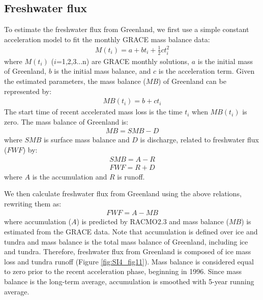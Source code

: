 \subsection{Freshwater flux}
To estimate the freshwater flux from Greenland, we first use a simple constant acceleration model to fit the monthly GRACE mass balance data:  
\begin{equation}
\begin{aligned}
M(t_{i})=a+bt_{i}+\frac{1}{2}ct_{i}^{2}
\end{aligned} 
\end{equation}
where $M(t_{i})$ ($i$=1,2,3...n) are GRACE monthly solutions, $a$ is the initial mass of Greenland, $b$ is the initial mass balance, and $c$ is the acceleration term.  Given the estimated parameters, the mass balance ($MB$) of Greenland can be represented by:
\begin{equation}
\begin{aligned}
MB(t_{i})=b+ct_{i}
\end{aligned} 
\end{equation}
The start time of recent accelerated mass loss is the time $t_{i}$ when $MB(t_{i})$ is zero.  The mass balance of Greenland is:
\begin{equation}
\begin{aligned}
MB=SMB-D
\end{aligned} 
\end{equation}
where $SMB$ is surface mass balance and $D$ is discharge, related to freshwater flux ($FWF$) by:
\begin{equation}
\begin{aligned}
SMB=A-R
\end{aligned} 
\end{equation}
\begin{equation}
\begin{aligned}
FWF=R+D
\end{aligned} 
\end{equation}
where $A$ is the accumulation and $R$ is runoff.

We then calculate freshwater flux from Greenland using the above relations, rewriting them as:
\begin{equation}
\begin{aligned}
FWF=A-MB
\end{aligned} 
\end{equation}
where accumulation ($A$) is predicted by RACMO2.3 and mass balance ($MB$) is estimated from the GRACE data.  Note that accumulation is defined over ice and tundra and mass balance is the total mass balance of Greenland, including ice and tundra.  Therefore, freshwater flux from Greenland is composed of ice mass loss and tundra runoff (Figure \ref{fig:SI4_fig11}).  Mass balance is considered equal to zero prior to the recent acceleration phase, beginning in 1996.  Since mass balance is the long-term average, accumulation is smoothed with 5-year running average.

